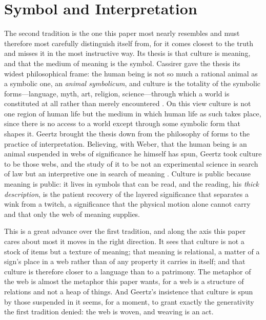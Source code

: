 \section{Symbol and Interpretation}
\label{p24:sec:hermeneutic}

\noindent
The second tradition is the one this paper most nearly resembles and must therefore most carefully distinguish itself from, for it comes closest to the truth and misses it in the most instructive way. Its thesis is that culture is meaning, and that the medium of meaning is the symbol. Cassirer gave the thesis its widest philosophical frame: the human being is not so much a rational animal as a symbolic one, an \emph{animal symbolicum}, and culture is the totality of the symbolic forms---language, myth, art, religion, science---through which a world is constituted at all rather than merely encountered \parencite{cassirer1944,cassirer1953}. On this view culture is not one region of human life but the medium in which human life as such takes place, since there is no access to a world except through some symbolic form that shapes it. Geertz brought the thesis down from the philosophy of forms to the practice of interpretation. Believing, with Weber, that the human being is an animal suspended in webs of significance he himself has spun, Geertz took culture to be those webs, and the study of it to be not an experimental science in search of law but an interpretive one in search of meaning \parencite{geertz1973}. Culture is public because meaning is public: it lives in symbols that can be read, and the reading, his \emph{thick description}, is the patient recovery of the layered significance that separates a wink from a twitch, a significance that the physical motion alone cannot carry and that only the web of meaning supplies.

This is a great advance over the first tradition, and along the axis this paper cares about most it moves in the right direction. It sees that culture is not a stock of items but a texture of meaning; that meaning is relational, a matter of a sign's place in a web rather than of any property it carries in itself; and that culture is therefore closer to a language than to a patrimony. The metaphor of the web is almost the metaphor this paper wants, for a web is a structure of relations and not a heap of things. And Geertz's insistence that culture is spun by those suspended in it seems, for a moment, to grant exactly the generativity the first tradition denied: the web is woven, and weaving is an act.

